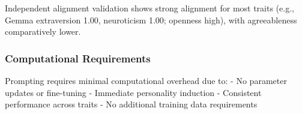 Independent alignment validation shows strong alignment for most traits (e.g., Gemma extraversion 1.00, neuroticism 1.00; openness high), with agreeableness comparatively lower.

\subsubsection{Computational Requirements}

Prompting requires minimal computational overhead due to:
- No parameter updates or fine-tuning
- Immediate personality induction
- Consistent performance across traits
- No additional training data requirements
